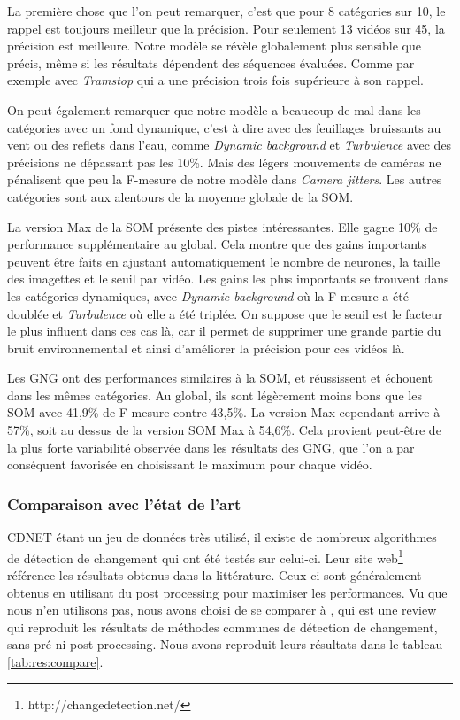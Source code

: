 	La première chose que l'on peut remarquer, c'est que pour 8 catégories sur 10, le rappel est toujours meilleur que la précision. Pour seulement 13 vidéos sur 45, la précision est meilleure. Notre modèle se révèle globalement plus sensible que précis, même si les résultats dépendent des séquences évaluées. Comme par exemple avec \textit{Tramstop} qui a une précision trois fois supérieure à son rappel.

	On peut également remarquer que notre modèle a beaucoup de mal dans les catégories avec un fond dynamique, c'est à dire avec des feuillages bruissants au vent ou des reflets dans l'eau, comme \textit{Dynamic background} et \textit{Turbulence} avec des précisions ne dépassant pas les 10\%. Mais des légers mouvements de caméras ne pénalisent que peu la F-mesure de notre modèle dans \textit{Camera jitters}. Les autres catégories sont aux alentours de la moyenne globale de la SOM.

	La version Max de la SOM présente des pistes intéressantes. Elle gagne 10\% de performance supplémentaire au global. Cela montre que des gains importants peuvent être faits en ajustant automatiquement le nombre de neurones, la taille des imagettes et le seuil par vidéo. Les gains les plus importants se trouvent dans les catégories dynamiques, avec \textit{Dynamic background} où la F-mesure a été doublée et \textit{Turbulence} où elle a été triplée. On suppose que le seuil est le facteur le plus influent dans ces cas là, car il permet de supprimer une grande partie du bruit environnemental et ainsi d'améliorer la précision pour ces vidéos là.

	Les GNG ont des performances similaires à la SOM, et réussissent et échouent dans les mêmes catégories. Au global, ils sont légèrement moins bons que les SOM avec 41,9\% de F-mesure contre 43,5\%. La version Max cependant arrive à 57\%, soit au dessus de la version SOM Max à 54,6\%. Cela provient peut-être de la plus forte variabilité observée dans les résultats des GNG, que l'on a par conséquent favorisée en choisissant le maximum pour chaque vidéo.

	\subsubsection{Comparaison avec l'état de l'art}

	CDNET étant un jeu de données très utilisé, il existe de nombreux algorithmes de détection de changement qui ont été testés sur celui-ci. Leur site web\footnote{http://changedetection.net/} référence les résultats obtenus dans la littérature. Ceux-ci sont généralement obtenus en utilisant du post processing pour maximiser les performances. Vu que nous n'en utilisons pas, nous avons choisi de se comparer à \cite{xu2016background}, qui est une review qui reproduit les résultats de méthodes communes de détection de changement, sans pré ni post processing. Nous avons reproduit leurs résultats dans le tableau \ref{tab:res:compare}.

